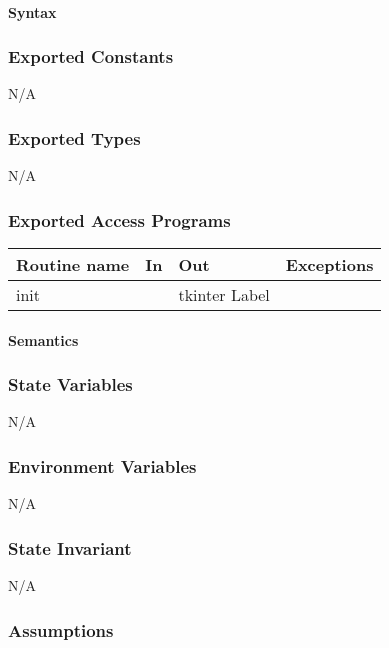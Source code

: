 \documentclass[12pt]{article}
\begin{document}
\paragraph*{Syntax}

\subsubsection*{Exported Constants}
N/A
\subsubsection*{Exported Types}

N/A

\subsubsection* {Exported Access Programs}

\begin{tabular}{| l | l | l | l |}
\hline
\textbf{Routine name} & \textbf{In} & \textbf{Out} & \textbf{Exceptions}\\
\hline
init & & tkinter Label & \\
\hline
\end{tabular}

\paragraph* {Semantics}

\subsubsection*{State Variables}

N/A

\subsubsection*{Environment Variables}

N/A

\subsubsection*{State Invariant}

N/A

\subsubsection*{Assumptions}
\end{document}
